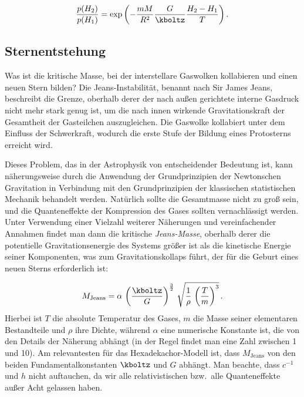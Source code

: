\begin{equation*}\label{eq:barometric_height_full_2}
  \frac{p(H_2)}{p(H_1)}=\exp\left(-\frac{m M}{R^2}\frac{G}{\kboltz} \frac{H_2-H_1}{T}\right).
\end{equation*}


\subsection*{Sternentstehung}

Was ist die kritische Masse, bei der interstellare Gaswolken kollabieren und einen neuen Stern bilden? Die Jeans-Instabilität, benannt nach Sir James Jeans, beschreibt die Grenze, oberhalb derer der nach außen gerichtete interne Gasdruck nicht mehr stark genug ist, um die nach innen wirkende Gravitationskraft der Gesamtheit der Gasteilchen auszugleichen. Die Gaswolke kollabiert unter dem Einfluss der Schwerkraft, wodurch die erste Stufe der Bildung eines Protosterns erreicht wird.

Dieses Problem, das in der Astrophysik von entscheidender Bedeutung ist, kann näherungsweise durch die Anwendung der Grundprinzipien der Newtonschen Gravitation in Verbindung mit den Grundprinzipien der klassischen statistischen Mechanik behandelt werden. Natürlich sollte die Gesamtmasse nicht zu groß sein, und die Quanteneffekte der Kompression des Gases sollten vernachlässigt werden. Unter Verwendung einer Vielzahl weiterer Näherungen und vereinfachender Annahmen findet man dann die kritische \emph{Jeans-Masse}, oberhalb derer die potentielle Gravitationsenergie des Systems größer ist als die kinetische Energie seiner Komponenten, was zum Gravitationskollaps führt, der für die Geburt eines neuen Sterns erforderlich ist:

\begin{equation*}
  M_{\mathrm {Jeans}}=\alpha\,
    \left(\frac {\kboltz}{G}\right)^{\frac{3}{2}}\,
    \sqrt {{\frac {1}{\rho}}\, 
    \left({\frac {T}{m}}\right)^3}\,.
\end{equation*}
%
Hierbei ist $T$ die absolute Temperatur des Gases, $m$ die Masse seiner elementaren Bestandteile und $\rho$ ihre Dichte, während $\alpha$ eine numerische Konstante ist, die von den Details der Näherung abhängt (in der Regel findet man eine Zahl zwischen 1 und 10). Am relevantesten für das Hexadekachor-Modell ist, dass $M_{\mathrm {Jeans}}$ von den beiden Fundamentalkonstanten $\kboltz$ und $G$ abhängt. Man beachte, dass $c^{-1}$ und $h$ nicht auftauchen, da wir alle relativistischen bzw.\ alle Quanteneffekte außer Acht gelassen haben.
